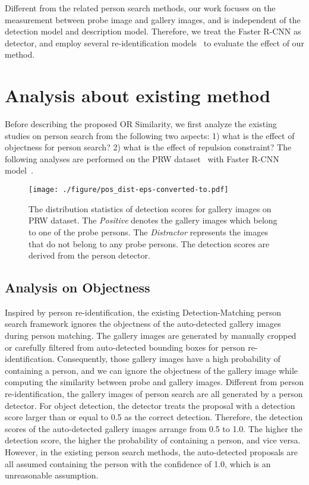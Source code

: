 \documentclass[journal]{IEEEtran}
\begin{document}
Different from the related person search methods, our work focuses on the measurement between probe image and gallery images, and is independent of the detection model and description model. 
Therefore, we treat the Faster R-CNN as detector, and employ several re-identification models~\cite{ChangHX18,SunZYTW18,WangYCLZ18} to evaluate the effect of our method.

\section{Analysis about existing method}
Before describing the proposed OR Similarity, we first analyze the existing studies on person search from the following two aspects: 1) what is the effect of objectness for person search? 2) what is the effect of repulsion constraint? The following analyses are performed on the PRW dataset~\cite{ZhengZSCYT17,LiuZTSSYYW17,LiZG18} with Faster R-CNN model~\cite{RenHG017}.

\begin{figure}
\begin{center}
\texttt{[image: ./figure/pos\_dist-eps-converted-to.pdf]}
\end{center}
\caption{The distribution statistics of detection scores for gallery images on PRW dataset. The \emph{Positive} denotes the gallery images which belong to one of the probe persons. The \emph{Distractor} represents the images that do not belong to any probe persons. The detection scores are derived from the person detector.}
\label{Fig:objectness_analysis}
\end{figure}

\subsection{Analysis on Objectness}
Inspired by person re-identification,  the existing Detection-Matching person search framework ignores the objectness of the auto-detected gallery images during person matching. 
The gallery images are generated by manually cropped or carefully filtered from auto-detected bounding boxes for person re-identification. 
Consequently, those gallery images have a high probability of containing a person, and we can ignore the objectness of the gallery image while computing the similarity between probe and gallery images. 
Different from person re-identification, the gallery images of person search are all generated by a person detector. For object detection, the detector treats the proposal with a detection score larger than or equal to 0.5 as the correct detection. 
Therefore, the detection scores of the auto-detected gallery images arrange from 0.5 to 1.0. The higher the detection score, the higher the probability of containing a person, and vice versa. However, in the existing person search methods, the auto-detected proposals are all assumed containing the person with the confidence of 1.0, which is an unreasonable assumption.
\end{document}
